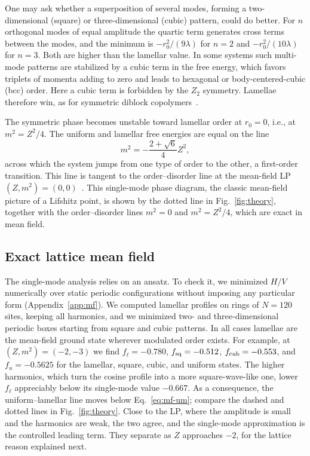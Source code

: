 \documentclass[aps,prd,twocolumn,superscriptaddress,nofootinbib,10pt]{revtex4-2}
\begin{document}
One may ask whether a superposition of several modes, forming a
two-dimensional (square) or three-dimensional (cubic) pattern, could do
better.  For $n$ orthogonal modes of equal amplitude the quartic term
generates cross terms between the modes, and the minimum is
$-r_0^2/(9\lambda)$ for $n=2$ and $-r_0^2/(10\lambda)$ for $n=3$.  Both are
higher than the lamellar value.  In some systems such multi-mode patterns are
stabilized by a cubic term in the free energy, which favors triplets of
momenta adding to zero and leads to hexagonal or body-centered-cubic (bcc)
order.  Here a cubic term is forbidden by the $Z_2$ symmetry.  Lamellae
therefore win, as for symmetric diblock copolymers~\cite{Leibler1980,
Fredrickson1987,Kats1993}.

The symmetric phase becomes unstable toward lamellar order at $r_0=0$, i.e.,
at $m^2=Z^2/4$.  The uniform and lamellar free energies are equal on the line
\begin{equation}
 m^2=-\frac{2+\sqrt6}{4}Z^2,
 \label{eq:mf-um}
\end{equation}
across which the system jumps from one type of order to the other, a
first-order transition.  This line is tangent to the order--disorder line at
the mean-field LP $(Z,m^2)=(0,0)$~\cite{Michelson1977}.  This single-mode
phase diagram, the classic mean-field picture of a Lifshitz point, is shown
by the dotted line in Fig.~\ref{fig:theory}, together with the order--disorder
lines $m^2=0$ and $m^2=Z^2/4$, which are exact in mean field.

\subsection{Exact lattice mean field}

The single-mode analysis relies on an ansatz.  To check it, we minimized $H/V$
numerically over static periodic configurations without imposing any
particular form (Appendix~\ref{app:mf}).  We computed lamellar profiles on
rings of $N=120$ sites, keeping all harmonics, and we minimized two- and
three-dimensional periodic boxes starting from square and cubic patterns.  In
all cases lamellae are the mean-field ground state wherever modulated order
exists.  For example, at $(Z,m^2)=(-2,-3)$ we find $f_\ell=-0.780$,
$f_{\rm sq}=-0.512$, $f_{\rm cub}=-0.553$, and $f_u=-0.5625$ for the lamellar,
square, cubic, and uniform states.  The higher harmonics, which turn the
cosine profile into a more square-wave-like one, lower $f_\ell$ appreciably
below its single-mode value $-0.667$.  As a consequence, the
uniform--lamellar line moves below Eq.~\eqref{eq:mf-um}; compare the dashed
and dotted lines in Fig.~\ref{fig:theory}.  Close to the LP, where the
amplitude is small and the harmonics are weak, the two agree, and the
single-mode approximation is the controlled leading term.  They separate as
$Z$ approaches $-2$, for the lattice reason explained next.
\end{document}
